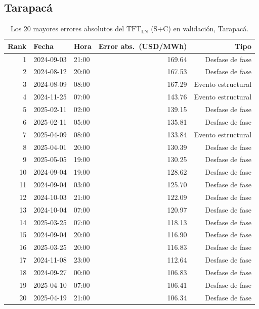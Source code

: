\clearpage
\subsection{Tarapacá}

\begin{table}[htbp]
    \centering
    \small
    \begin{tabular}{rllrr}
        \toprule
        Rank & Fecha       & Hora  & Error abs.\ (USD/MWh) & Tipo \\
        \midrule
 1 & 2024-09-03 & 21:00 & 169.64 & Desfase de fase \\
 2 & 2024-08-12 & 20:00 & 167.53 & Desfase de fase \\
 3 & 2024-08-09 & 08:00 & 167.29 & Evento estructural \\
 4 & 2024-11-25 & 07:00 & 143.76 & Evento estructural \\
 5 & 2025-02-11 & 02:00 & 139.15 & Desfase de fase \\
 6 & 2025-02-11 & 05:00 & 135.81 & Desfase de fase \\
 7 & 2025-04-09 & 08:00 & 133.84 & Evento estructural \\
 8 & 2025-04-01 & 20:00 & 130.39 & Desfase de fase \\
 9 & 2025-05-05 & 19:00 & 130.25 & Desfase de fase \\
10 & 2024-09-04 & 19:00 & 128.62 & Desfase de fase \\
11 & 2024-09-04 & 03:00 & 125.70 & Desfase de fase \\
12 & 2024-10-03 & 21:00 & 122.09 & Desfase de fase \\
13 & 2024-10-04 & 07:00 & 120.97 & Desfase de fase \\
14 & 2025-03-25 & 07:00 & 118.13 & Desfase de fase \\
15 & 2024-09-04 & 20:00 & 116.90 & Desfase de fase \\
16 & 2025-03-25 & 20:00 & 116.83 & Desfase de fase \\
17 & 2024-11-08 & 23:00 & 112.64 & Desfase de fase \\
18 & 2024-09-27 & 00:00 & 106.83 & Desfase de fase \\
19 & 2025-04-10 & 07:00 & 106.41 & Desfase de fase \\
20 & 2025-04-19 & 21:00 & 106.34 & Desfase de fase \\
        \bottomrule
    \end{tabular}
    \vspace{0.2cm}
    \caption{Los 20 mayores errores absolutos del $\text{TFT}_\text{LN}$ (S+C) en validación, Tarapacá.}
    \label{tab:top20_tarapaca}
\end{table}

